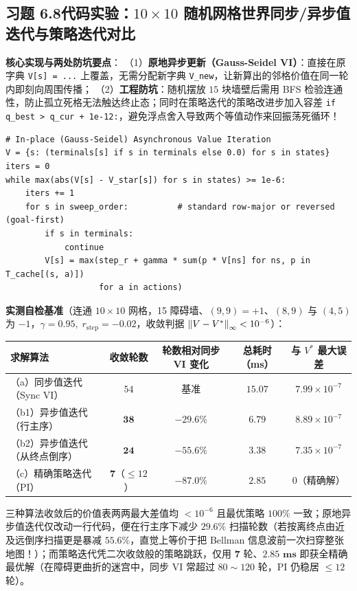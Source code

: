 \subsection*{习题 6.8\quad 代码实验：$10\times 10$ 随机网格世界同步/异步值迭代与策略迭代对比}
\textbf{核心实现与两处防坑要点}：
（1）\textbf{原地异步更新（Gauss-Seidel VI）}：直接在原字典 \texttt{V[s] = ...} 上覆盖，无需分配新字典 \texttt{V\_new}，让新算出的邻格价值在同一轮内即刻向周围传播；
（2）\textbf{工程防坑}：随机摆放 $15$ 块墙壁后需用 BFS 检验连通性，防止孤立死格无法触达终止态；同时在策略迭代的策略改进步加入容差 \texttt{if q\_best > q\_cur + 1e-12:}，避免浮点舍入导致两个等值动作来回振荡死循环！
\begin{lstlisting}
# In-place (Gauss-Seidel) Asynchronous Value Iteration
V = {s: (terminals[s] if s in terminals else 0.0) for s in states}
iters = 0
while max(abs(V[s] - V_star[s]) for s in states) >= 1e-6:
    iters += 1
    for s in sweep_order:          # standard row-major or reversed (goal-first)
        if s in terminals:
            continue
        V[s] = max(step_r + gamma * sum(p * V[ns] for ns, p in T_cache[(s, a)])
                   for a in actions)
\end{lstlisting}
\textbf{实测自检基准}（连通 $10\times 10$ 网格，15 障碍墙、$(9,9)=+1$、$(8,9)$ 与 $(4,5)$ 为 $-1$，$\gamma=0.95,\; r_{\text{step}}=-0.02$，收敛判据 $\left\|V - V^*\right\|_\infty < 10^{-6}$）：
\begin{center}
\small
\begin{tabular}{@{}lcccc@{}}
\toprule
\textbf{求解算法} & \textbf{收敛轮数} & \textbf{轮数相对同步 VI 变化} & \textbf{总耗时（ms）} & \textbf{与 $V^*$ 最大误差} \\
\midrule
（a）同步值迭代（Sync VI） & $54$ & 基准 & $15.07$ & $7.99\times 10^{-7}$ \\
（b1）异步值迭代（行主序） & $\mathbf{38}$ & $\mathbf{-29.6\%}$ & $6.79$ & $8.89\times 10^{-7}$ \\
（b2）异步值迭代（从终点倒序） & $\mathbf{24}$ & $\mathbf{-55.6\%}$ & $3.38$ & $7.35\times 10^{-7}$ \\
（c）精确策略迭代（PI） & $\mathbf{7}$（$\le 12$） & $\mathbf{-87.0\%}$ & $\mathbf{2.85}$ & $0$（精确解） \\
\bottomrule
\end{tabular}
\end{center}
三种算法收敛后的价值表两两最大差值均 $< 10^{-6}$ 且最优策略 $100\%$ 一致；原地异步值迭代仅改动一行代码，便在行主序下减少 $29.6\%$ 扫描轮数（若按离终点由近及远倒序扫描更是暴减 $55.6\%$，直觉上等价于把 Bellman 信息波前一次扫穿整张地图！）；而策略迭代凭二次收敛般的策略跳跃，仅用 $\mathbf{7}$ 轮、$\mathbf{2.85\text{ ms}}$ 即获全精确最优解（在障碍更曲折的迷宫中，同步 VI 常超过 $80\sim 120$ 轮，PI 仍稳居 $\le 12$ 轮）。
